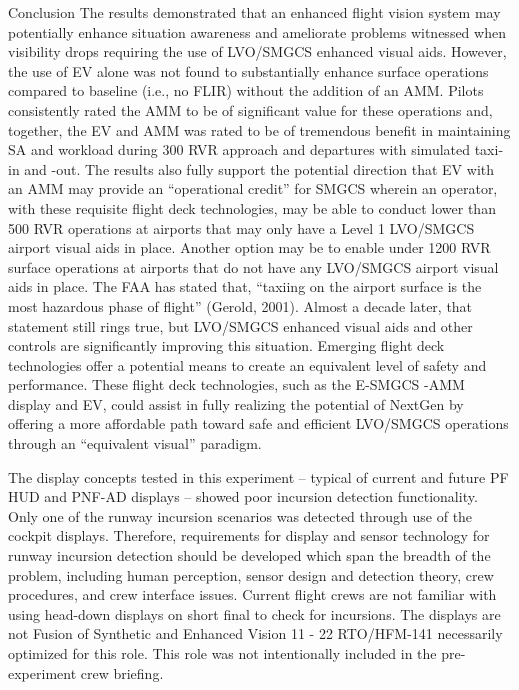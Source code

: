 \documentclass[utf8,bachelor,manualbib]{gradu3}
\begin{document}
Conclusion
The results demonstrated that an enhanced flight vision system may potentially enhance situation awareness and ameliorate problems witnessed when visibility drops requiring the use of LVO/SMGCS enhanced visual aids. However, the use of EV alone was not found to substantially enhance surface operations compared to baseline (i.e., no FLIR) without the addition of an AMM. Pilots consistently rated the AMM to be of significant value for these operations and, together, the EV and AMM was rated to be of tremendous benefit in maintaining SA and workload during 300 RVR approach and departures with simulated taxi-in and -out. The results also fully support the potential direction that EV with an AMM may provide an “operational credit” for SMGCS wherein an operator, with these requisite flight deck technologies, may be able to conduct lower than 500 RVR operations at airports that may only have a Level 1 LVO/SMGCS airport visual aids in place. Another option may be to enable under 1200 RVR surface operations at airports that do not have any LVO/SMGCS airport visual aids in place.
The FAA has stated that, “taxiing on the airport surface is the most hazardous phase of flight” (Gerold, 2001). Almost a decade later, that statement still rings true, but LVO/SMGCS enhanced visual aids and other controls are significantly improving this situation. Emerging flight deck technologies offer a potential means to create an equivalent level of safety and performance. These flight deck technologies, such as the E-SMGCS -AMM display and EV, could assist in fully realizing the potential of NextGen by offering a more affordable path toward safe and efficient LVO/SMGCS operations through an “equivalent visual” paradigm. \citep{prinzel2013}

The display concepts tested in this experiment – typical of current and future PF HUD and PNF-AD displays
– showed poor incursion detection functionality. Only one of the runway incursion scenarios was detected
through use of the cockpit displays. Therefore, requirements for display and sensor technology for runway
incursion detection should be developed which span the breadth of the problem, including human perception,
sensor design and detection theory, crew procedures, and crew interface issues. Current flight crews are not
familiar with using head-down displays on short final to check for incursions. The displays are not
Fusion of Synthetic and Enhanced Vision
11 - 22 RTO/HFM-141
necessarily optimized for this role. This role was not intentionally included in the pre-experiment crew
briefing. \citep{baileyym2007}
\end{document}
